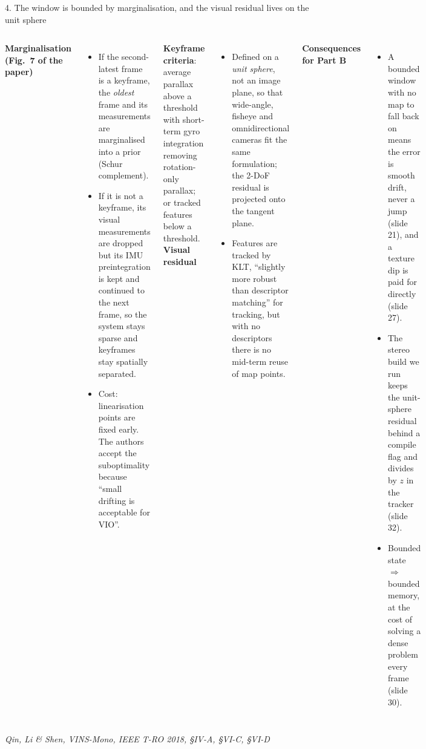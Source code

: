 \documentclass[11pt,aspectratio=169]{beamer}
\newcommand{\src}[1]{\vfill{\tiny\color{black!55}#1}}
\newcommand{\paper}[1]{\textit{#1}}
\begin{document}
\begin{frame}{4. The window is bounded by marginalisation, and the visual residual lives on the unit sphere}
  \begin{columns}[T]
      \scriptsize
      \textbf{Marginalisation (Fig.~7 of the paper)}
      \begin{itemize}
        \item If the second-latest frame is a keyframe, the \emph{oldest}
              frame and its measurements are marginalised into a prior (Schur
              complement).
        \item If it is not a keyframe, its visual measurements are dropped
              but its IMU preintegration is kept and continued to the next
              frame, so the system stays sparse and keyframes stay spatially
              separated.
        \item Cost: linearisation points are fixed early. The authors accept
              the suboptimality because ``small drifting is acceptable for
              VIO''.
      \end{itemize}
      \textbf{Keyframe criteria}: average parallax above a threshold with
      short-term gyro integration removing rotation-only parallax; or tracked
      features below a threshold.
      \scriptsize
      \textbf{Visual residual}
      \begin{itemize}
        \item Defined on a \emph{unit sphere}, not an image plane, so that
              wide-angle, fisheye and omnidirectional cameras fit the same
              formulation; the 2-DoF residual is projected onto the tangent
              plane.
        \item Features are tracked by KLT, ``slightly more robust than
              descriptor matching'' for tracking, but with no descriptors
              there is no mid-term reuse of map points.
      \end{itemize}
      \textbf{Consequences for Part B}
      \begin{itemize}
        \item A bounded window with no map to fall back on means the error
              is smooth drift, never a jump (slide 21), and a texture dip is
              paid for directly (slide 27).
        \item The stereo build we run keeps the unit-sphere residual behind
              a compile flag and divides by $z$ in the tracker (slide 32).
        \item Bounded state $\Rightarrow$ bounded memory, at the cost of
              solving a dense problem every frame (slide 30).
      \end{itemize}
  \end{columns}
  \src{\paper{Qin, Li \& Shen, VINS-Mono, IEEE T-RO 2018, §IV-A, §VI-C, §VI-D}}
\end{frame}
\end{document}
